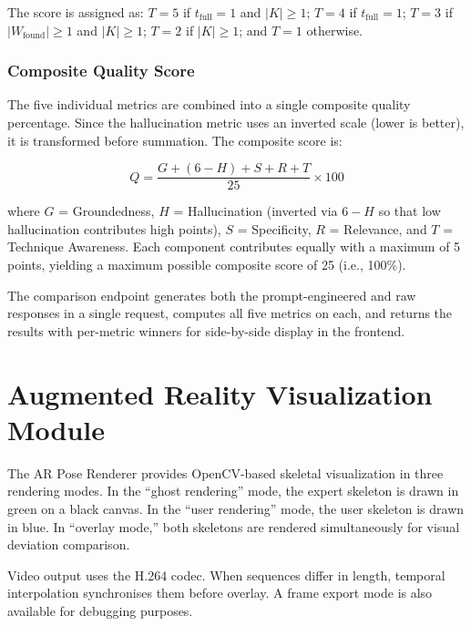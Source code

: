 The score is assigned as: $T = 5$ if $t_{\text{full}} = 1$ and $|K| \geq 1$; $T = 4$ if $t_{\text{full}} = 1$; $T = 3$ if $|W_{\text{found}}| \geq 1$ and $|K| \geq 1$; $T = 2$ if $|K| \geq 1$; and $T = 1$ otherwise.


\subsubsection{Composite Quality Score}

The five individual metrics are combined into a single composite quality percentage. Since the hallucination metric uses an inverted scale (lower is better), it is transformed before summation. The composite score is:

\[
Q = \frac{G + (6 - H) + S + R + T}{25} \times 100
\]

\noindent where $G$ = Groundedness, $H$ = Hallucination (inverted via $6 - H$ so that low hallucination contributes high points), $S$ = Specificity, $R$ = Relevance, and $T$ = Technique Awareness. Each component contributes equally with a maximum of 5 points, yielding a maximum possible composite score of 25 (i.e., 100\%).

The comparison endpoint generates both the prompt-engineered and raw responses in a single request, computes all five metrics on each, and returns the results with per-metric winners for side-by-side display in the frontend.


\section{Augmented Reality Visualization Module}

The AR Pose Renderer provides OpenCV-based skeletal visualization in three rendering modes. In the ``ghost rendering'' mode, the expert skeleton is drawn in green on a black canvas. In the ``user rendering'' mode, the user skeleton is drawn in blue. In ``overlay mode,'' both skeletons are rendered simultaneously for visual deviation comparison.

Video output uses the H.264 codec. When sequences differ in length, temporal interpolation synchronises them before overlay. A frame export mode is also available for debugging purposes.
